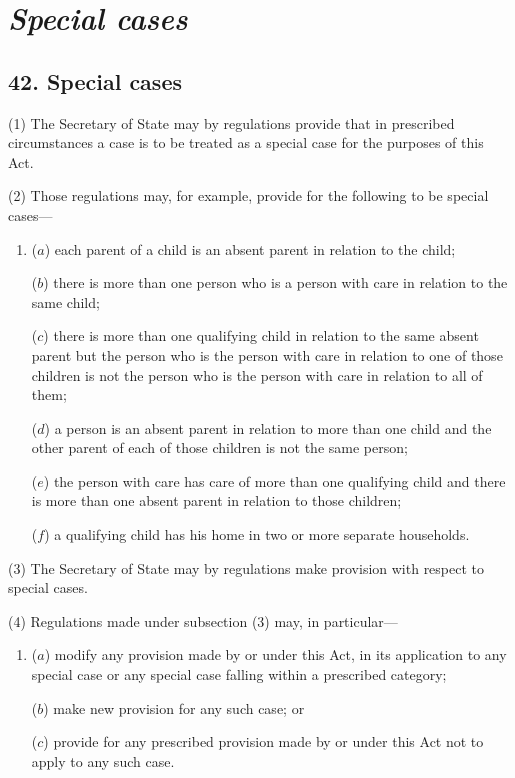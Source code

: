 \documentclass[12pt,a4paper]{article}
\begin{document}

\section{\itshape Special cases}

\subsection{42. Special cases}

(1) The Secretary of State may by regulations provide that in prescribed circumstances a case is to be treated as a special case for the purposes of this Act.

(2) Those regulations may, for example, provide for the following to be special cases—
\begin{enumerate}\item[]
($a$) each parent of a child is an absent parent in relation to the child;

($b$) there is more than one person who is a person with care in relation to the same child;

($c$) there is more than one qualifying child in relation to the same absent parent but the person who is the person with care in relation to one of those children is not the person who is the person with care in relation to all of them;

($d$) a person is an absent parent in relation to more than one child and the other parent of each of those children is not the same person;

($e$) the person with care has care of more than one qualifying child and there is more than one absent parent in relation to those children;

($f$) a qualifying child has his home in two or more separate households.
\end{enumerate}

(3) The Secretary of State may by regulations make provision with respect to special cases.

(4) Regulations made under subsection (3)  may, in particular—
\begin{enumerate}\item[]
($a$) modify any provision made by or under this Act, in its application to any special case or any special case falling within a prescribed category;

($b$) make new provision for any such case; or

($c$) provide for any prescribed provision made by or under this Act not to apply to any such case.
\end{enumerate}
\end{document}
